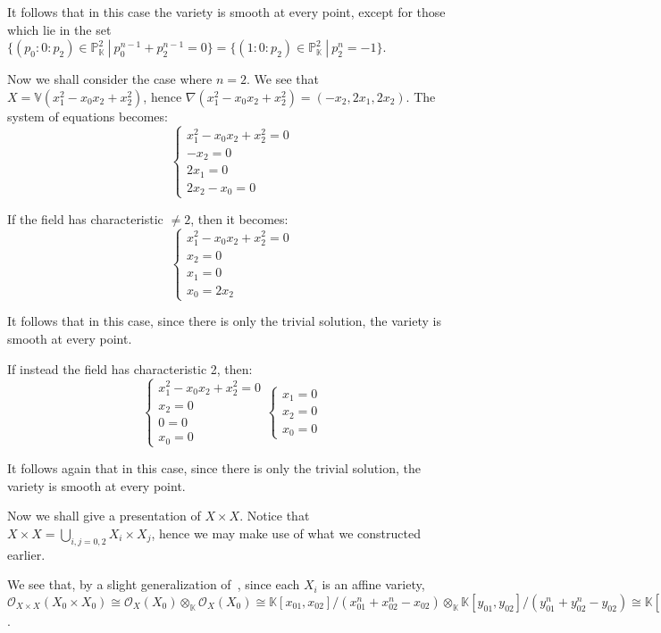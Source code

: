 \documentclass{article}
\newcommand{\numberset}{\mathbb}
\newcommand{\K}{\numberset{K}}
\newcommand{\V}{\mathbb{V}}
\newcommand{\Ps}{\mathbb{P}}
\begin{document}
It follows that in this case the variety is smooth at every point, except for those which lie in the set $\{(p_0:0:p_2)\in\Ps^2_{\K}\ |\ p_0^{n-1}+p_2^{n-1}=0\}=\{(1:0:p_2)\in\Ps^2_{\K}\ |\ p_2^n=-1\}$.

Now we shall consider the case where $n=2$. We see that $X=\V(x_1^2-x_0x_2+x_2^2)$, hence $\nabla(x_1^2-x_0x_2+x_2^2)=(-x_2,2x_1,2x_2)$. The system of equations becomes:
$$
\begin{cases}
  x_1^2-x_0x_2+x_2^2=0 \\
  -x_2=0 \\
  2x_1=0 \\
  2x_2-x_0=0
\end{cases}
$$

If the field has characteristic $\neq 2$, then it becomes:
$$
\begin{cases}
  x_1^2-x_0x_2+x_2^2=0 \\
  x_2=0 \\
  x_1=0 \\
  x_0=2x_2
\end{cases}
$$

It follows that in this case, since there is only the trivial solution, the variety is smooth at every point.

If instead the field has characteristic 2, then:
$$
\begin{cases}
  x_1^2-x_0x_2+x_2^2=0 \\
  x_2=0 \\
  0=0 \\
  x_0=0
\end{cases}
\begin{cases}
  x_1=0 \\
  x_2=0 \\
  x_0=0
\end{cases}
$$

It follows again that in this case, since there is only the trivial solution, the variety is smooth at every point.

Now we shall give a presentation of $X\times X$. Notice that $X\times X =\bigcup_{i,j=0,2} X_i\times X_j$, hence we may make use of what we constructed earlier.

We see that, by a slight generalization of~\cite[lemma 5.2.1]{edix}, since each $X_i$ is an affine variety, $\mathcal{O}_{X\times X}(X_0\times X_0)\cong\mathcal{O}_X(X_0)\otimes_{\K}\mathcal{O}_X(X_0)\cong\K[x_{01},x_{02}]/(x_{01}^n+x_{02}^n-x_{02})\otimes_{\K}\K[y_{01},y_{02}]/(y_{01}^n+y_{02}^n-y_{02})\cong\K[x_{01},x_{02},y_{01},y_{02}]/(x_{01}^n+x_{02}^n-x_{02},y_{01}^n+y_{02}^n-y_{02})$.
\end{document}
